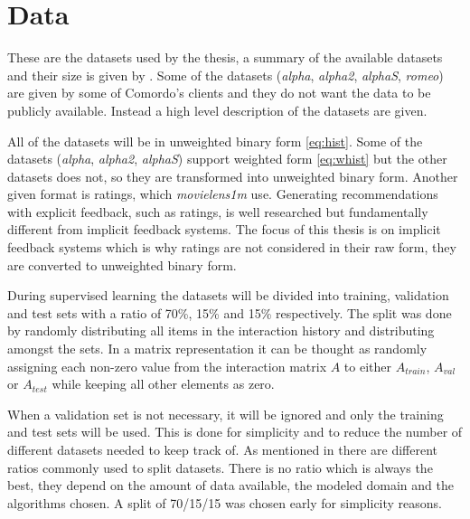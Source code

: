 
\section{Data}\label{sec:datasets}

These are the datasets used by the thesis, a summary of the available datasets and their size is given by . Some of the datasets (\textit{alpha}, \textit{alpha2}, \textit{alphaS}, \textit{romeo}) are given by some of Comordo's clients and they do not want the data to be publicly available. Instead a high level description of the datasets are given.

All of the datasets will be in unweighted binary form \eqref{eq:hist}. Some of the datasets (\textit{alpha}, \textit{alpha2}, \textit{alphaS}) support weighted form \eqref{eq:whist} but the other datasets does not, so they are transformed into unweighted binary form. Another given format is ratings, which \textit{movielens1m} use. Generating recommendations with explicit feedback, such as ratings, is well researched but fundamentally different from implicit feedback systems. The focus of this thesis is on implicit feedback systems which is why ratings are not considered in their raw form, they are converted to unweighted binary form.

During supervised learning the datasets will be divided into training, validation and test sets with a ratio of 70\%, 15\% and 15\% respectively. The split was done by randomly distributing all items in the interaction history and distributing amongst the sets. In a matrix representation it can be thought as randomly assigning each non-zero value from the interaction matrix $A$ to either $A_{train}$, $A_{val}$ or $A_{test}$ while keeping all other elements as zero.

When a validation set is not necessary, it will be ignored and only the training and test sets will be used. This is done for simplicity and to reduce the number of different datasets needed to keep track of.  As mentioned in  there are different ratios commonly used to split datasets. There is no ratio which is always the best, they depend on the amount of data available, the modeled domain and the algorithms chosen. A split of 70/15/15 was chosen early for simplicity reasons.

